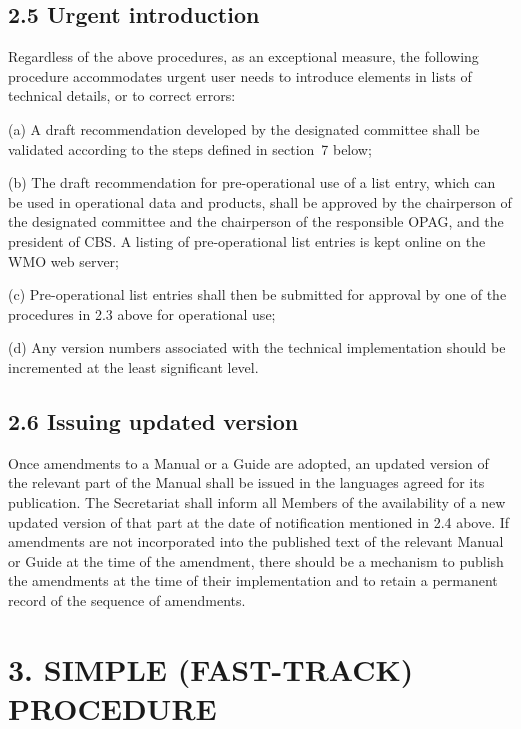 \hypertarget{urgent-introduction}{%
\subsection{2.5 Urgent introduction}\label{urgent-introduction}}

Regardless of the above procedures, as an exceptional measure, the following procedure accommodates urgent user needs to introduce elements in lists of technical details, or to correct errors:

(a) A draft recommendation developed by the designated committee shall be validated according to the steps defined in section~7 below;

(b) The draft recommendation for pre-operational use of a list entry, which can be used in operational data and products, shall be approved by the chairperson of the designated committee and the chairperson of the responsible OPAG, and the president of CBS. A listing of pre-operational list entries is kept online on the WMO web server;

(c) Pre-operational list entries shall then be submitted for approval by one of the procedures in 2.3 above for operational use;

(d) Any version numbers associated with the technical implementation should be incremented at the least significant level.

\hypertarget{issuing-updated-version}{%
\subsection{2.6 Issuing updated version}\label{issuing-updated-version}}

Once amendments to a Manual or a Guide are adopted, an updated version of the relevant part of the Manual shall be issued in the languages agreed for its publication. The Secretariat shall inform all Members of the availability of a new updated version of that part at the date of notification mentioned in 2.4 above. If amendments are not incorporated into the published text of the relevant Manual or Guide at the time of the amendment, there should be a mechanism to publish the amendments at the time of their implementation and to retain a permanent record of the sequence of amendments.

\hypertarget{simple-fast-track-procedure}{%
\section{3. SIMPLE (FAST-TRACK) PROCEDURE}\label{simple-fast-track-procedure}}

